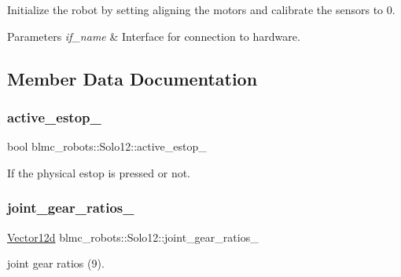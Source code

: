 Initialize the robot by setting aligning the motors and calibrate the sensors to 0. 


\begin{DoxyParams}{Parameters}
{\em if\+\_\+name} & Interface for connection to hardware. \\
\hline
\end{DoxyParams}


\subsection{Member Data Documentation}
\mbox{\label{classblmc__robots_1_1Solo12_a9e28ceac427c283b4e66a1bde15baed8}} 
\subsubsection{\texorpdfstring{active\+\_\+estop\+\_\+}{active\_estop\_}}
{\footnotesize\ttfamily bool blmc\+\_\+robots\+::\+Solo12\+::active\+\_\+estop\+\_\+\hspace{0.3cm}{\ttfamily [private]}}



If the physical estop is pressed or not. 

\mbox{\label{classblmc__robots_1_1Solo12_a03d025b7fa51624e1de5865340429b9f}} 
\subsubsection{\texorpdfstring{joint\+\_\+gear\+\_\+ratios\+\_\+}{joint\_gear\_ratios\_}}
{\footnotesize\ttfamily \hyperlink{common__header_8hpp_a80313eb420184518596e745eecf4b494}{Vector12d} blmc\+\_\+robots\+::\+Solo12\+::joint\+\_\+gear\+\_\+ratios\+\_\+\hspace{0.3cm}{\ttfamily [private]}}



joint gear ratios (9). 

